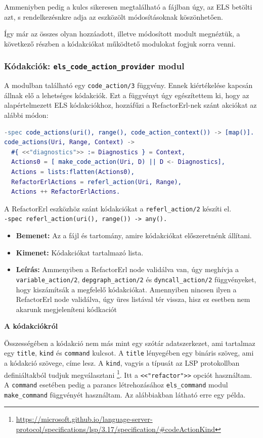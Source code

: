 Ammeniyben pedig a kulcs sikeresen megtalálható a fájlban úgy, az ELS betölti azt, s rendelkezésnkre adja az eszközölt módosításoknak köszönhetően.

Így már az összes olyan hozzáadott, illetve módosított modult megnéztük, a következő részben a kódakciókat működtető modulokat fogjuk sorra venni. 


\subsubsection{Kódakciók: \lstinline{els_code_action_provider} modul }
A modulban található egy \lstinline{code_action/3} függvény. Ennek kiértékelése kapcsán állnak elő a lehetséges kódakciók. Ezt a függvényt úgy egészítettem ki, hogy az alapértelmezett ELS kódakciókhoz, hozzáfűzi a RefactorErl-nek szánt akciókat az alábbi módon:

\begin{lstlisting}[language={erlang}]
-spec code_actions(uri(), range(), code_action_context()) -> [map()].
code_actions(Uri, Range, Context) ->
  #{ <<"diagnostics">> := Diagnostics } = Context,
  Actions0 = [ make_code_action(Uri, D) || D <- Diagnostics],
  Actions = lists:flatten(Actions0),
  RefactorErlActions = referl_action(Uri, Range),
  Actions ++ RefactorErlActions.
\end{lstlisting}

\noindent A RefactorErl eszközhöz szánt kódakciókat a \lstinline{referl_action/2} készíti el. \\
\noindent \lstinline{-spec referl_action(uri(), range()) -> any().}
\begin{itemize}
    \item \textbf{Bemenet:} Az a fájl és tartomány, amire kódakciókat előszeretnénk állítani.
    \item \textbf{Kimenet:} Kódakciókat tartalmazó lista.
    \item \textbf{Leírás:} Ammenyiben a RefactorErl node validálva van, úgy meghívja a \lstinline{variable_action/2}, \lstinline{depgraph_action/2} és \lstinline{dyncall_action/2} függvényeket, hogy kiszámítsák a megfelelő kódakciókat. Amennyiben nincsen ilyen a RefactorErl node validálva, úgy üres listával tér vissza, hisz ez esetben nem akarunk megjeleníteni kódkaciót
\end{itemize}

\noindent \textbf{A kódakciókról}

Összességében a kódakció nem más mint egy szótár adatszerkezet, ami tartalmaz egy \lstinline{title}, \lstinline{kind} és \lstinline{command} kulcsot. A \lstinline{title} lényegében egy bináris szöveg, ami a kódakció szövege, címe lesz. A \lstinline{kind}, vagyis a típusát az LSP protokollban definiáltakból tudjuk megválasztani \footnote{\url{https://microsoft.github.io/language-server-protocol/specifications/lsp/3.17/specification/\#codeActionKind}}. Itt a \lstinline{<<"refactor">>} opciót használtam. A \lstinline{command} esetében pedig a parancs létrehozásához \lstinline{els_command} modul \lstinline{make_command} függvényét használtam. Az alábbiakban látható erre egy példa.

